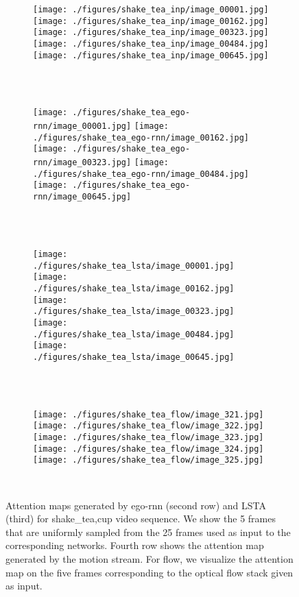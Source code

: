 \documentclass[10pt,twocolumn,letterpaper]{article}
\begin{document}
\begin{matrix*}[r]
\begin{figure*}[t]
	\centering      
	\begin{subfigure}[b]{0.95\textwidth}
		\texttt{[image: ./figures/shake\_tea\_inp/image\_00001.jpg]}
		\texttt{[image: ./figures/shake\_tea\_inp/image\_00162.jpg]}
		\texttt{[image: ./figures/shake\_tea\_inp/image\_00323.jpg]}
		\texttt{[image: ./figures/shake\_tea\_inp/image\_00484.jpg]}
		\texttt{[image: ./figures/shake\_tea\_inp/image\_00645.jpg]}
	\end{subfigure}\\ \vskip 2mm
	\ 
	\begin{subfigure}[b]{0.95\textwidth}
		\texttt{[image: ./figures/shake\_tea\_ego-rnn/image\_00001.jpg]}
		\texttt{[image: ./figures/shake\_tea\_ego-rnn/image\_00162.jpg]}
		\texttt{[image: ./figures/shake\_tea\_ego-rnn/image\_00323.jpg]}
		\texttt{[image: ./figures/shake\_tea\_ego-rnn/image\_00484.jpg]}
		\texttt{[image: ./figures/shake\_tea\_ego-rnn/image\_00645.jpg]}
	\end{subfigure}\\ \vskip 2mm
	\ 
	\begin{subfigure}[b]{0.95\textwidth}
		\texttt{[image: ./figures/shake\_tea\_lsta/image\_00001.jpg]}
		\texttt{[image: ./figures/shake\_tea\_lsta/image\_00162.jpg]}
		\texttt{[image: ./figures/shake\_tea\_lsta/image\_00323.jpg]}
		\texttt{[image: ./figures/shake\_tea\_lsta/image\_00484.jpg]}
		\texttt{[image: ./figures/shake\_tea\_lsta/image\_00645.jpg]}
	\end{subfigure}\\ \vskip 2mm	       
	\ 
	\begin{subfigure}[b]{0.95\textwidth}
		\texttt{[image: ./figures/shake\_tea\_flow/image\_321.jpg]}
		\texttt{[image: ./figures/shake\_tea\_flow/image\_322.jpg]}
		\texttt{[image: ./figures/shake\_tea\_flow/image\_323.jpg]}
		\texttt{[image: ./figures/shake\_tea\_flow/image\_324.jpg]}
		\texttt{[image: ./figures/shake\_tea\_flow/image\_325.jpg]}
	\end{subfigure}\\ \vskip 2mm			 
	\caption{Attention maps generated by ego-rnn (second row) and LSTA (third) for shake\_tea,cup video sequence. We show the 5 frames that are uniformly sampled from the 25 frames used as input to the corresponding networks. Fourth row shows the attention map generated by the motion stream. For flow, we visualize the attention map on the five frames corresponding to the optical flow stack given as input.}
	\label{fig:att_map_shake_tea}
\end{figure*}	


\end{matrix*}
\end{document}
